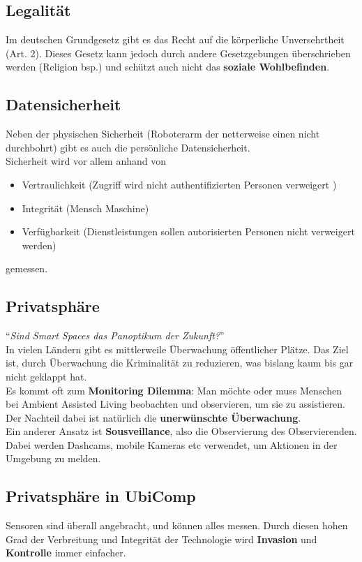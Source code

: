 \documentclass[a4paper]{article}
\begin{document}
\subsection{Legalität}
Im deutschen Grundgesetz gibt es das Recht auf die körperliche Unversehrtheit (Art. 2). Dieses Gesetz kann jedoch durch andere Gesetzgebungen überschrieben werden (Religion bsp.) und schützt auch nicht das \textbf{soziale Wohlbefinden}.

\subsection{Datensicherheit}
Neben der physischen Sicherheit (Roboterarm der netterweise einen nicht durchbohrt) gibt es auch die persönliche Datensicherheit.\\
Sicherheit wird vor allem anhand von
\begin{itemize}
	\item Vertraulichkeit (Zugriff wird nicht authentifizierten Personen verweigert )
	\item Integrität (Mensch Maschine)
	\item Verfügbarkeit (Dienstleistungen sollen autorisierten Personen nicht verweigert werden)
\end{itemize}
gemessen.

\subsection{Privatsphäre}
``\textit{Sind Smart Spaces das Panoptikum der Zukunft?}''\\

In vielen Ländern gibt es mittlerweile Überwachung öffentlicher Plätze. Das Ziel ist, durch Überwachung die Kriminalität zu reduzieren, was bislang kaum bis gar nicht geklappt hat. \\

Es kommt oft zum \textbf{Monitoring Dilemma}: Man möchte oder muss Menschen bei Ambient Assisted Living beobachten und observieren, um sie zu assistieren. Der Nachteil dabei ist natürlich die \textbf{unerwünschte Überwachung}.\\
Ein anderer Ansatz ist \textbf{Sousveillance}, also die Observierung des Observierenden. Dabei werden Dashcams, mobile Kameras etc verwendet, um Aktionen in der Umgebung zu melden.

\subsection{Privatsphäre in UbiComp}
Sensoren sind überall angebracht, und können alles messen. Durch diesen hohen Grad der Verbreitung und Integrität der Technologie wird \textbf{Invasion} und \textbf{Kontrolle} immer einfacher. \\
\end{document}
